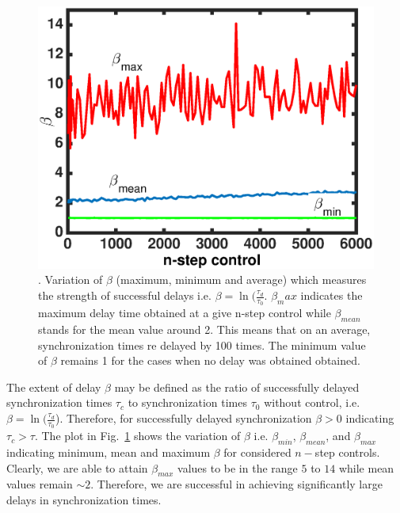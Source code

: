\documentclass[preprint,showpacs,preprintnumbers,amsmath,amssymb]{revtex4-1}
\begin{document}
 \begin{figure}[t]
\includegraphics[scale=0.6]{Strength_con.eps}
\caption{\label{fig:Strength_con} \footnotesize. Variation of $\beta$ 
(maximum, minimum and average) which measures the strength of successful 
delays i.e. $\beta = \ln(\frac{\tau_d}{\tau_0}$. $\beta_max$ indicates the 
maximum delay time obtained at a give n-step control while $\beta_{mean}$ 
stands for the mean value around 2. This means that on an average, 
synchronization times re delayed by 100 times. The minimum value of $\beta$ 
remains 1 for the cases when no delay was obtained obtained. }
\end{figure}


  The extent of delay $\beta$ may be defined as the ratio of successfully 
  delayed synchronization times $\tau_c$ to synchronization times $\tau_0$ 
  without control, i.e. $\beta =  \ln(\frac{\tau_d}{\tau_0}$).  Therefore, for 
  successfully delayed synchronization $\beta>0$ indicating $\tau_c > \tau$. 
  The plot in Fig.~\ref{fig:Strength_con} shows the variation of $\beta$ i.e. 
  $\beta_{min}$, $\beta_{mean}$, and $\beta_{max}$  indicating minimum, mean 
  and maximum $\beta$ for considered $n-$step controls. Clearly, we are able 
  to attain $\beta_{max}$ values to be in the range $5$ to $14$ while mean 
  values remain $\sim2$. Therefore, we are successful in achieving 
  significantly large delays in synchronization times. 
  
\end{document}
